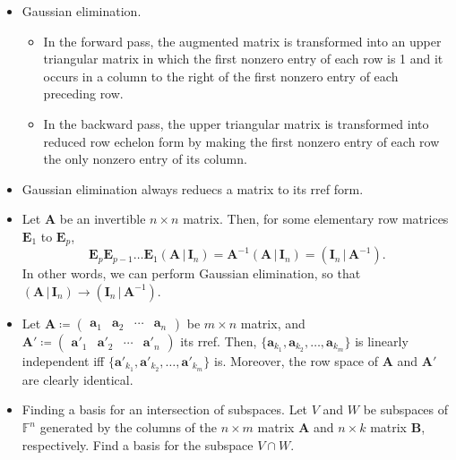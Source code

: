 \documentclass[../Notes.tex]{subfiles}
\begin{document}
\begin{stbox}{}
    \begin{itemize}
        \item Gaussian elimination. 
        \begin{itemize}
            \item In the forward pass, the augmented matrix is transformed into an upper triangular matrix in which the first nonzero entry of each row is 1 and it occurs in a column to the right of the first nonzero entry
            of each preceding row.
            \item  In the backward pass, the upper triangular matrix is transformed into reduced row echelon form by making the first nonzero entry of each row the only nonzero entry of its column.
        \end{itemize}
        \item Gaussian elimination always reduecs a matrix to its rref form.
        \item Let \(\mathbf{A}\) be an invertible \(n\times n\) matrix. Then, for some elementary row matrices \(\mathbf{E}_1\) to \(\mathbf{E}_p\),
        \[\mathbf{E}_p\mathbf{E}_{p-1}\dots \mathbf{E}_1(\mathbf{A} \,\vert\, \mathbf{I}_n)=\mathbf{A}^{-1}(\mathbf{A} \,\vert\, \mathbf{I}_n)=(\mathbf{I}_n \,\vert\, \mathbf{A}^{-1}).\]
        In other words, we can perform Gaussian elimination, so that \((\mathbf{A} \,\vert\, \mathbf{I}_n)\to (\mathbf{I}_n \,\vert\, \mathbf{A}^{-1})\).
        \item Let \(\mathbf{A}\coloneq
        \begin{pmatrix}
            \mathbf{a}_1&\mathbf{a}_2&\cdots&\mathbf{a}_n
        \end{pmatrix}\) be \(m\times n\) matrix, and \(\mathbf{A}'\coloneq
        \begin{pmatrix}
            \mathbf{a'}_1&\mathbf{a'}_2&\cdots&\mathbf{a'}_n
        \end{pmatrix}\) its rref. Then, \(\{\mathbf{a}_{k_1},\mathbf{a}_{k_2},\dots,\mathbf{a}_{k_m}\}\) is linearly independent iff \(\{\mathbf{a'}_{k_1},\mathbf{a'}_{k_2},\dots,\mathbf{a'}_{k_m}\}\) is. Moreover, the row space of \(\mathbf{A}\) and \(\mathbf{A}'\) are clearly identical.
        \item Finding a basis for an intersection of subspaces. Let \(V\) and \(W\) be subspaces of \(\mathbb{F}^n\) generated by the columns of the \(n\times m\) matrix \(\mathbf{A}\) and \(n\times k\) matrix \(\mathbf{B}\), respectively. Find a basis for the subspace \(V\cap W\). 
        \begin{enumerate}

\end{enumerate}
\end{itemize}
\end{stbox}
\end{document}
